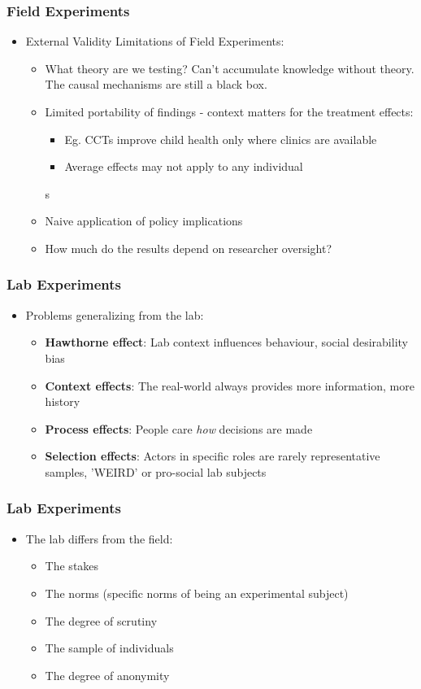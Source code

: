 \documentclass[xcolor=x11names,compress]{beamer}\usepackage[]{graphicx}\usepackage[]{color}
\renewcommand{\(}{\begin{columns}}
\renewcommand{\)}{\end{columns}}
\newcommand{\<}[1]{\begin{column}{#1}}
\renewcommand{\>}{\end{column}}
\begin{document}
\begin{frame}
\frametitle{Field Experiments}
\begin{itemize}
\item External Validity Limitations of Field Experiments:
\pause
\begin{itemize}
\item What theory are we testing? Can't accumulate knowledge without theory. The causal mechanisms are still a black box.
\item Limited portability of findings - context matters for the treatment effects:
\begin{itemize}
\item Eg. CCTs improve child health only where clinics are available
\item Average effects may not apply to any individual
\end{itemize}s
\item Naive application of policy implications
\item How much do the results depend on researcher oversight?
\end{itemize}
\end{itemize}
\end{frame}

\begin{frame}
\frametitle{Lab Experiments}
\begin{itemize}
\item Problems generalizing from the lab:
\begin{itemize}
\item \textbf{Hawthorne effect}: Lab context influences behaviour, social desirability bias
\item \textbf{Context effects}: The real-world always provides more information, more history
\item \textbf{Process effects}: People care \textit{how} decisions are made
\item \textbf{Selection effects}: Actors in specific roles are rarely representative samples, 'WEIRD' or pro-social lab subjects
\end{itemize}
\end{itemize}
\end{frame}

\begin{frame}
\frametitle{Lab Experiments}
\begin{itemize}
\item The lab differs from the field:
\pause
\begin{itemize}
\item The stakes
\item The norms (specific norms of being an experimental subject)
\item The degree of scrutiny
\item The sample of individuals
\item The degree of anonymity
\end{itemize}
\end{itemize}
\end{frame}
\end{document}
